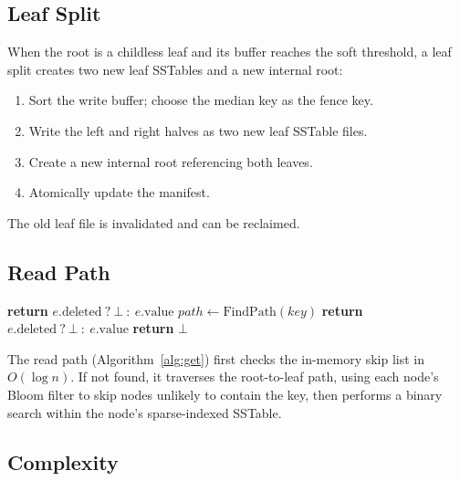 \documentclass[10pt,twocolumn]{article}
\begin{document}
\subsection{Leaf Split}

When the root is a childless leaf and its buffer reaches the soft threshold, a
leaf split creates two new leaf SSTables and a new internal root:

\begin{enumerate}[leftmargin=1.5em]
  \item Sort the write buffer; choose the median key as the fence key.
  \item Write the left and right halves as two new leaf SSTable files.
  \item Create a new internal root referencing both leaves.
  \item Atomically update the manifest.
\end{enumerate}

The old leaf file is invalidated and can be reclaimed.

\subsection{Read Path}

\begin{algorithm}[t]
\caption{Get($key$)}
\label{alg:get}
\begin{algorithmic}[1]
 
  \State \textbf{return} $e.\mathrm{deleted}\ ?\ \bot\ :\ e.\mathrm{value}$
\EndIf
\State $\mathit{path} \gets \mathrm{FindPath}(key)$ 
   
      \State \textbf{return} $e.\mathrm{deleted}\ ?\ \bot\ :\ e.\mathrm{value}$
    \EndIf
  \EndIf
\EndFor
\State \textbf{return} $\bot$
\end{algorithmic}
\end{algorithm}

The read path (Algorithm~\ref{alg:get}) first checks the in-memory skip list
in $O(\log n)$.  If not found, it traverses the root-to-leaf path, using each
node's Bloom filter to skip nodes unlikely to contain the key, then performs a
binary search within the node's sparse-indexed SSTable.

\subsection{Complexity}
\end{document}
